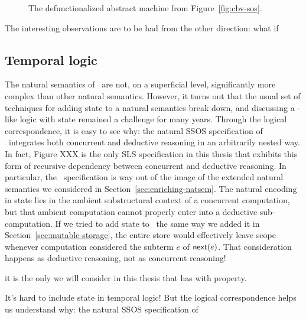 \begin{figure}[t]
\caption{The defunctionalized abstract machine from Figure~\ref{fig:cbv-sos}.}
\label{fig:cbv-sos-defun}
\end{figure}

The interesting observations are to be had from the other direction: what if

\subsection{Temporal logic}

The natural semantics of \rowan~are not, on a superficial level,
significantly more complex than other natural semantics. However, it
turns out that the usual set of techniques for adding state to a
natural semantics break down, and discussing a \rowan-like logic with
state remained a challenge for many years. Through the
logical correspondence, it is easy to see why: the natural SSOS
specification of \rowan~integrates both concurrent and deductive
reasoning in an arbitrarily nested way. In fact, Figure XXX is the
only SLS specification in this thesis that exhibits this form of
recursive dependency between concurrent and deductive reasoning.  In
particular, the \rowan~specification is way out of the image of the
extended natural semantics we considered in
Section~\ref{sec:enriching-natsem}. The natural encoding in state lies
in the ambient substructural context of a concurrent computation, but
that ambient computation cannot properly enter into a deductive
sub-computation. If we tried to add state to \rowan~the same way we
added it in Section~\ref{sec:mutable-storage}, the entire store
would effectively leave scope whenever computation considered
the subterm $e$ of ${\sf next}(e)$. That consideration happens
as deductive reasoning, not as concurrent reasoning!

 it is the only we
will consider in this thesis that has with property.

It's hard to include state in temporal logic! But the logical correspondence
helps us understand why: the natural SSOS specification of 